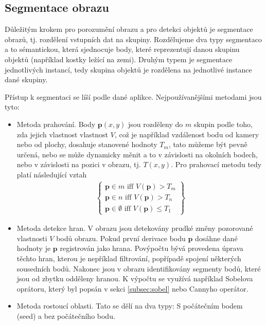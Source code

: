 \documentclass[twoside]{ctuthesis}
\newcommand{\tl}[1]{$\mathbf{#1}$}
\begin{document}
\subsection{Segmentace obrazu}
\label{subsection:segmentation}
Důležitým krokem pro porozumění obrazu a pro detekci objektů je segmentace obrazů, tj. rozdělení vstupních dat na skupiny. Rozdělujeme dva typy segmentaco a to sémantickou, která sjednocuje body, které reprezentují danou skupinu objektů (například kostky ležící na zemi). Druhým typem je segmentace jednotlivých instancí, tedy skupina objektů je rozdělena na jednotlivé instance dané skupiny. 

    Přístup k segmentaci se líší podle dané aplikce. Nejpoužívanějšími metodami jsou tyto:
\begin{itemize}
    \item Metoda prahování. Body $\mathbf{p}(x,y)$ jsou rozděleny do $m$ skupin podle toho, zda jejich vlastnost vlastnost $V$, což je například vzdálenost bodu od kamery nebo od plochy, dosahuje stanovené hodnoty $T_m$, tato můžeme být pevně určená, nebo se může dynamicky měnit a to v závislosti na okolních bodech, nebo v závislosti na pozici v obrazu, tj. $T(x,y)$. Pro prahovací metodu tedy platí následující vztah
        \begin{align}
\left\{ 
        \begin{gathered}
            \mathbf{p} \in m \text{ iff } V(\mathbf{p}) > T_m \\
            \mathbf{p} \in n \text{ iff } V(\mathbf{p}) > T_n \\
            \mathbf{p} \in \emptyset \text{ iff } V(\mathbf{p}) \leq T_1 
        \end{gathered}
\right\}
        \end{align}
 
    \item Metoda detekce hran. V obrazu jsou detekovány prudké změny pozorované vlastnosti $V$ bodů obrazu. Pokud první derivace bodu \tl{p} dosáhne dané hodnoty je \tl{p} registrován jako hrana. Povýpočtu bývá provedena úprava těchto hran, kterou je nepříklad filtrování, popřípadě spojení některých sousedních bodů. Nakonec jsou v obrazu identifikovány segmenty bodů, které jsou od zbytku odděleny hranou. K výpočtu se využívá například Sobelova oprátoru, který byl popsán v sekci \ref{subsec:sobel} nebo Cannyho operátor.

    \item Metoda rostoucí oblasti. Tato se dělí na dva typy: S počátečním bodem (seed) a bez počátečního bodu. 


\end{itemize}
\end{document}
